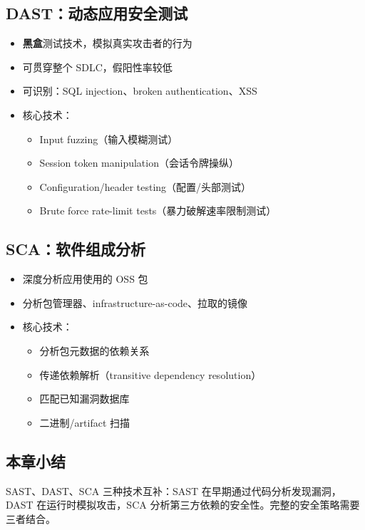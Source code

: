 \documentclass[a4paper]{article}
\begin{document}
\subsection{DAST：动态应用安全测试}

\begin{itemize}
    \item \textbf{黑盒}测试技术，模拟真实攻击者的行为
    \item 可贯穿整个 SDLC，假阳性率较低
    \item 可识别：SQL injection、broken authentication、XSS
    \item 核心技术：
    \begin{itemize}
        \item Input fuzzing（输入模糊测试）
        \item Session token manipulation（会话令牌操纵）
        \item Configuration/header testing（配置/头部测试）
        \item Brute force rate-limit tests（暴力破解速率限制测试）
    \end{itemize}
\end{itemize}

\subsection{SCA：软件组成分析}

\begin{itemize}
    \item 深度分析应用使用的 OSS 包
    \item 分析包管理器、infrastructure-as-code、拉取的镜像
    \item 核心技术：
    \begin{itemize}
        \item 分析包元数据的依赖关系
        \item 传递依赖解析（transitive dependency resolution）
        \item 匹配已知漏洞数据库
        \item 二进制/artifact 扫描
    \end{itemize}
\end{itemize}

\subsection{本章小结}

SAST、DAST、SCA 三种技术互补：SAST 在早期通过代码分析发现漏洞，DAST 在运行时模拟攻击，SCA 分析第三方依赖的安全性。完整的安全策略需要三者结合。
\end{document}
